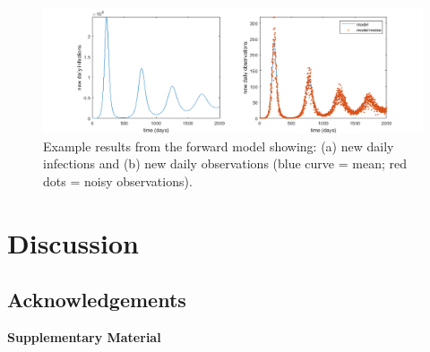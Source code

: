 \documentclass[12pt]{article}
\begin{document}
\begin{figure}
    \centering
    \includegraphics[width=\textwidth]{figures/forward_model.png}
    \caption{Example results from the forward model showing: (a) new daily infections and (b) new daily observations (blue curve = mean; red dots = noisy observations). }
    \label{fig:forward_model}
\end{figure}







\section*{Discussion}

\subsection*{Acknowledgements}


\printbibliography





\clearpage
\setcounter{page}{1}
\setcounter{section}{0}
\setcounter{equation}{0}
\setcounter{figure}{0}
\setcounter{table}{0}
\renewcommand\thepage{S\arabic{page}}
\renewcommand\thesection{S\arabic{section}}
\renewcommand\theequation{S\arabic{equation}}
\renewcommand\thefigure{S\arabic{figure}}
\renewcommand\thetable{S\arabic{table}}

\begin{center}
    {\Large\bf Supplementary Material}
\end{center}

\tableofcontents 

\clearpage



\begin{refsection}





\begin{suppfigure}
    \caption{Supplementary Figure}
    \label{fig:}
\end{suppfigure}



\clearpage

\printbibliography[heading=subbibliography]
\end{refsection}
\end{document}

